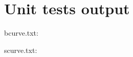 \section{Unit tests output}

\begin{scriptsize}
\begin{ttfamily}

\end{ttfamily}
\end{scriptsize}

bcurve.txt:\\

\begin{scriptsize}
\begin{ttfamily}

\end{ttfamily}
\end{scriptsize}

scurve.txt:\\

\begin{scriptsize}
\begin{ttfamily}

\end{ttfamily}
\end{scriptsize}


